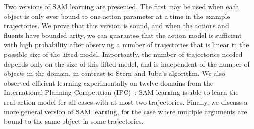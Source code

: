 \documentclass{article}
\begin{document}
Two versions of SAM learning are presented. The first %
may be used when each object is only ever bound to one action parameter at a time in the example trajectories.
We prove that this version is sound, and when the actions and fluents have bounded arity, we can guarantee that the action model is sufficient with high probability after observing a number of trajectories that is linear in the possible size of the lifted model.
Importantly, the number of trajectories needed depends only on the size of this lifted model, and is independent of the number of objects in the domain, in contrast to Stern and Juba's algorithm. 
We also observed efficient learning experimentally on twelve domains from the International Planning Competition (IPC)~\cite{ipc}: SAM learning is able to learn the real action model for all cases with at most two trajectories.
Finally, we discuss a more general version of SAM learning, for the case where multiple arguments are bound to the same object in some trajectories.













\end{document}
